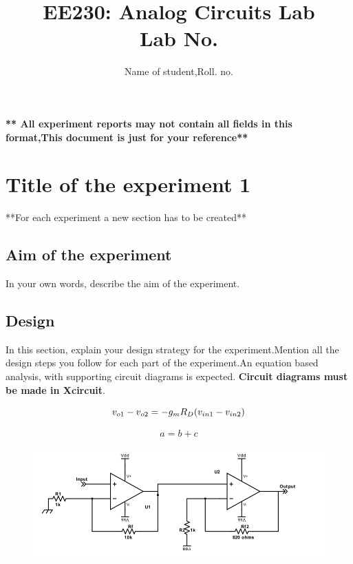 \documentclass[12pt]{article}
\title{EE230: Analog Circuits Lab\\ Lab No.}
\author{Name of student,Roll. no.}
\begin{document}
\maketitle

\textbf{ ** All experiment reports may not contain all fields in this format,This document is just for your reference**} 

\section{Title of the experiment 1}
**For each experiment a new section has to be created**
\subsection{Aim of the experiment}

In your own words, describe the aim of the experiment.


\subsection{Design}

In this section, explain your design strategy for the experiment.Mention all the design steps you follow for each part of the experiment.An equation based analysis, with supporting circuit diagrams is expected. \textbf{Circuit diagrams must be made in Xcircuit}.
 
 \begin{equation}
     v_{o1}-v_{o2}
     \newline
     = -g_mR_D(v_{in1}-v_{in2})
 \end{equation}     
 
 \begin{equation}
     a=b+c
 \end{equation}     

\begin{figure}[h!]
\centering
\includegraphics[scale = 0.4]{hall_amp.png}
\end{figure}
\end{document}
